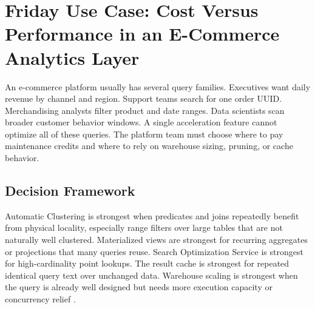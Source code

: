\section{Friday Use Case: Cost Versus Performance in an E-Commerce Analytics Layer}
An e-commerce platform usually has several query families. Executives want daily revenue by channel and region. Support teams search for one order UUID. Merchandising analysts filter product and date ranges. Data scientists scan broader customer behavior windows. A single acceleration feature cannot optimize all of these queries. The platform team must choose where to pay maintenance credits and where to rely on warehouse sizing, pruning, or cache behavior.
\subsection{Decision Framework}
Automatic Clustering is strongest when predicates and joins repeatedly benefit from physical locality, especially range filters over large tables that are not naturally well clustered. Materialized views are strongest for recurring aggregates or projections that many queries reuse. Search Optimization Service is strongest for high-cardinality point lookups. The result cache is strongest for repeated identical query text over unchanged data. Warehouse scaling is strongest when the query is already well designed but needs more execution capacity or concurrency relief \cite{snowflakeAutomaticClusteringDocs,snowflakeMaterializedViewsDocs,snowflakeSearchOptimizationDocs}.
